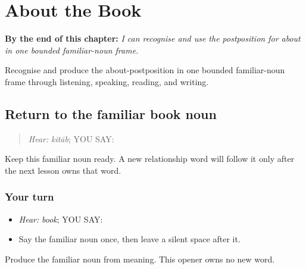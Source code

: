 
\chapter{About the Book}
\label{ch:pa-a2-baare}

\begin{chapteropening}
\textbf{By the end of this chapter:} \emph{I can recognise and use the postposition for about in one bounded familiar-noun frame.}

Recognise and produce the about-postposition in one bounded familiar-noun frame through listening, speaking, reading, and writing.
\end{chapteropening}

\section[\texorpdfstring{\pa{ਕਿਤਾਬ} (kitaab)}{ਕਿਤਾਬ (kitaab)}]{Return to the familiar book noun}

\label{lesson:PA-C203-book-return}



\begin{quote}
\emph{Hear:} \emph{kitāb}; YOU SAY: \textbf{}
\end{quote}

\begin{grammarlens}[title={Grammar Lens}]
Keep this familiar noun ready. A new relationship word will follow it only after the next lesson owns that word.
\end{grammarlens}

\subsection*{Your turn}
\begin{itemize}
\raggedright
  \item \emph{Hear:} \emph{book}; YOU SAY: \textbf{}
  \item Say the familiar noun once, then leave a silent space after it.
\end{itemize}

\begin{tcolorbox}[breakable,colback=teal!4,colframe=teal!35!black,title={Before you move on}]
Produce the familiar noun from meaning. This opener owns no new word.
\end{tcolorbox}
